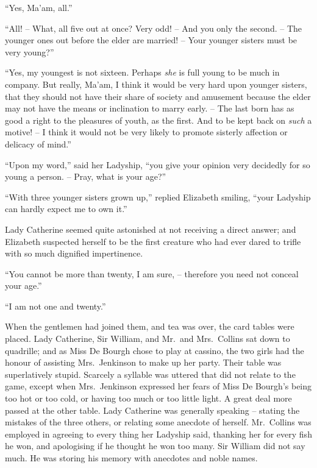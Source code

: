 “Yes, Ma’am, all.”

“All! -- What, all five out at once? Very odd! -- And
you only the second. -- The younger ones out before the
elder are married! -- Your younger sisters must be very
young?”

“Yes, my youngest is not sixteen. Perhaps \textit{she} is full
young to be much in company. But really, Ma’am,
I think it would be very hard upon younger sisters, that
they should not have their share of society and amusement
because the elder may not have the means or inclination
to marry early. -- The last born has as good a right to the
pleasures of youth, as the first. And to be kept back on
\textit{such} a motive! -- I think it would not be very likely to
promote sisterly affection or delicacy of mind.”

“Upon my word,” said her Ladyship, “you give your
opinion very decidedly for so young a person. -- Pray, what
is your age?”

“With three younger sisters grown up,” replied Elizabeth
smiling, “your Ladyship can hardly expect me to own
it.”

Lady Catherine seemed quite astonished at not receiving
a direct answer; and Elizabeth suspected herself to be
the first creature who had ever dared to trifle with so
much dignified impertinence.

“You cannot be more than twenty, I am sure, -- therefore
you need not conceal your age.”

“I am not one and twenty.”

When the gentlemen had joined them, and tea was over,
the card tables were placed. Lady Catherine, Sir William,
and Mr.\ and Mrs.\ Collins sat down to quadrille; and as
Miss De Bourgh chose to play at cassino, the two girls
had the honour of assisting Mrs.\ Jenkinson to make up
her party. Their table was superlatively stupid. Scarcely
a syllable was uttered that did not relate to the game,
except when Mrs.\ Jenkinson expressed her fears of Miss
De Bourgh’s being too hot or too cold, or having too much
or too little light. A great deal more passed at the other
table. Lady Catherine was generally speaking -- stating
the mistakes of the three others, or relating some anecdote
of herself. Mr.\ Collins was employed in agreeing to
every thing her Ladyship said, thanking her for every
fish he won, and apologising if he thought he won too
many. Sir William did not say much. He was storing
his memory with anecdotes and noble names.

